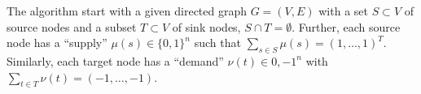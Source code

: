\documentclass[10pt,a4paper]{article}
\begin{document}
	The algorithm start with a given directed graph $G=(V,E)$ with a set $S \subset V$ of source nodes and a subset $T \subset V$ of sink nodes, $S \cap T = \emptyset$. Further, each source node has a ``supply'' $\mu(s) \in \{0,1\}^n$ such that $\sum_{s \in S} \mu(s) = (1,\dots,1)^T$. Similarly, each target node has a ``demand'' $\nu(t) \in {0,-1}^n$ with $\sum_{t \in T} \nu(t) = (-1,\dots,-1)$.
\end{document}
